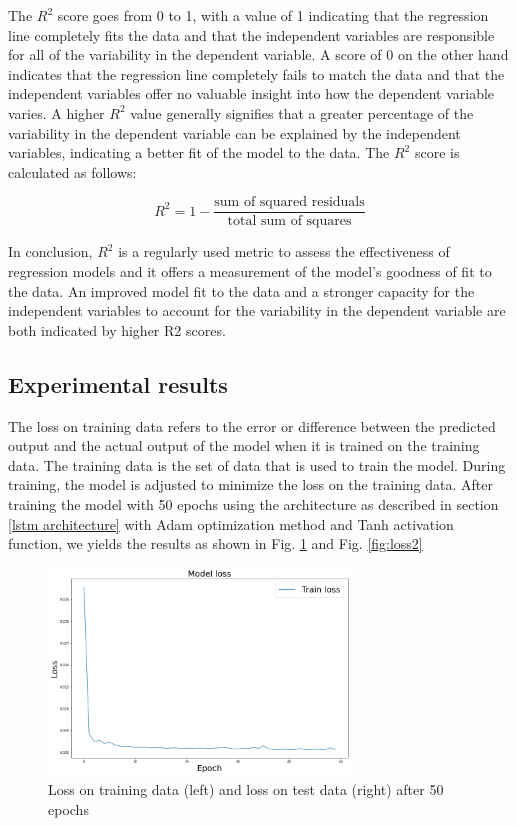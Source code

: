 \documentclass[a4paper]{article}
\begin{document}
The $R^2$ score goes from 0 to 1, with a value of 1 indicating that the regression line completely fits the data and that the independent variables are responsible for all of the variability in the dependent variable. A score of 0 on the other hand indicates that the regression line completely fails to match the data and that the independent variables offer no valuable insight into how the dependent variable varies. A higher $R^2$ value generally signifies that a greater percentage of the variability in the dependent variable can be explained by the independent variables, indicating a better fit of the model to the data. The $R^2$ score is calculated as follows:

$$
R^2 = 1 - \frac{\text{sum of squared residuals}}{\text{total sum of squares}}
$$

In conclusion, $R^2$ is a regularly used metric to assess the effectiveness of regression models and it offers a measurement of the model's goodness of fit to the data. An improved model fit to the data and a stronger capacity for the independent variables to account for the variability in the dependent variable are both indicated by higher R2 scores.
\subsection{Experimental results} \label{results}

The loss on training data refers to the error or difference between the predicted output and the actual output of the model when it is trained on the training data. The training data is the set of data that is used to train the model. During training, the model is adjusted to minimize the loss on the training data. After training the model with 50 epochs using the architecture as described in section \ref{lstm architecture} with Adam optimization method and Tanh activation function, we yields the results as shown in Fig. \ref{fig:loss1} and Fig. \ref{fig:loss2}

\begin{figure}[!h]
    \centering
    \includegraphics[width=8cm]{r1_1.png}
    \caption{Loss on training data (left) and loss on test data (right) after 50 epochs}
    \label{fig:loss1}
\end{figure}
\end{document}
